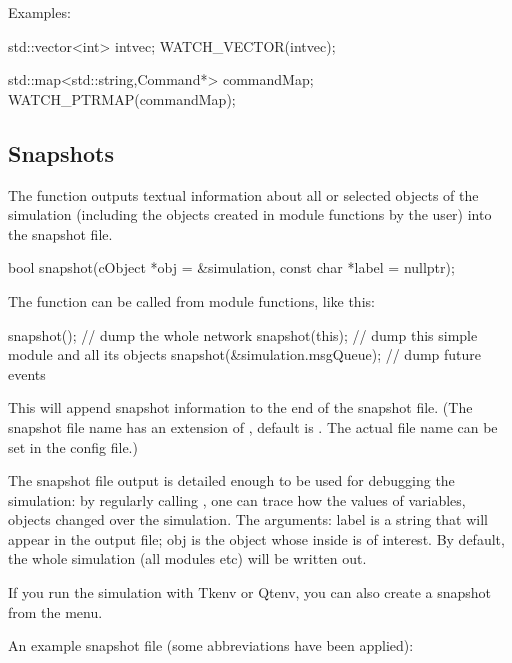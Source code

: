 Examples:

\begin{cpp}
std::vector<int> intvec;
WATCH_VECTOR(intvec);

std::map<std::string,Command*> commandMap;
WATCH_PTRMAP(commandMap);
\end{cpp}



\subsection{Snapshots}
\label{sec:ch-sim-lib:snapshots}

The  function outputs textual information about all
or selected objects of the simulation (including the objects created
in module functions by the user) into the snapshot file.

\begin{cpp}
bool snapshot(cObject *obj = &simulation, const char *label = nullptr);
\end{cpp}

The function can be called from module functions, like this:

\begin{cpp}
snapshot();     // dump the whole network
snapshot(this); // dump this simple module and all its objects
snapshot(&simulation.msgQueue); // dump future events
\end{cpp}

This will append snapshot information to the end of the snapshot file.
(The snapshot file name has an extension of , default is
. The actual file name can be set in the
config file.)

The snapshot file output is detailed enough to be used for debugging
the simulation: by regularly calling , one can trace
how the values of variables, objects changed over the simulation.
The arguments: label is a string that will appear in the output
file; obj is the object whose inside is of interest. By default,
the whole simulation (all modules etc) will be written out.

If you run the simulation with Tkenv or Qtenv, you can also create a
snapshot from the menu.

An example snapshot file (some abbreviations have been applied):

